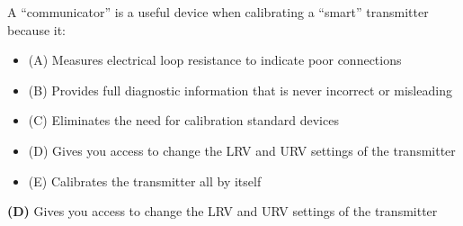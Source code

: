 

A ``communicator'' is a useful device when calibrating a ``smart'' transmitter because it:

\begin{itemize}
\item{(A)} Measures electrical loop resistance to indicate poor connections
\vskip 5pt 
\item{(B)} Provides full diagnostic information that is never incorrect or misleading
\vskip 5pt 
\item{(C)} Eliminates the need for calibration standard devices
\vskip 5pt 
\item{(D)} Gives you access to change the LRV and URV settings of the transmitter
\vskip 5pt 
\item{(E)} Calibrates the transmitter all by itself
\end{itemize}







{\bf (D)} Gives you access to change the LRV and URV settings of the transmitter
 










